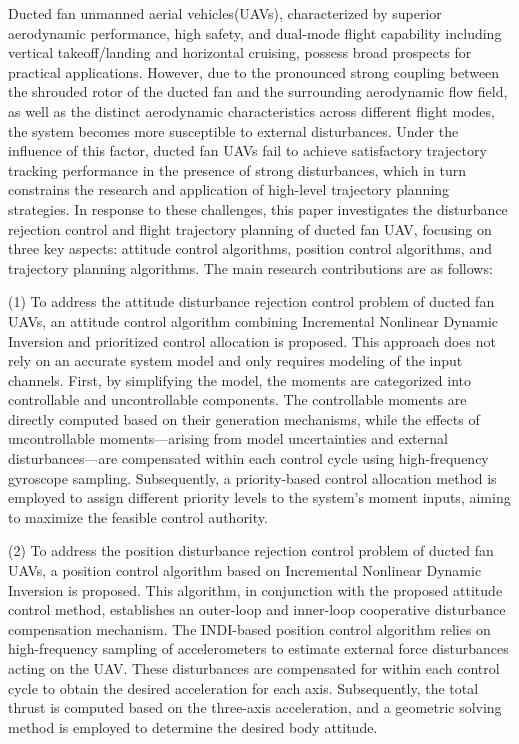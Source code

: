 Ducted fan unmanned aerial vehicles(UAVs), characterized by superior aerodynamic performance, high safety, and dual-mode flight capability including vertical takeoff/landing and horizontal cruising, possess broad prospects for practical applications. However, due to the pronounced strong coupling between the shrouded rotor of the ducted fan and the surrounding aerodynamic flow field, as well as the distinct aerodynamic characteristics across different flight modes, the system becomes more susceptible to external disturbances. Under the influence of this factor, ducted fan UAVs fail to achieve satisfactory trajectory tracking performance in the presence of strong disturbances, which in turn constrains the research and application of high-level trajectory planning strategies. In response to these challenges, this paper investigates the disturbance rejection control and flight trajectory planning of ducted fan UAV, focusing on three key aspects: attitude control algorithms, position control algorithms, and trajectory planning algorithms. The main research contributions are as follows:

(1) To address the attitude disturbance rejection control problem of ducted fan UAVs, an attitude control algorithm combining Incremental Nonlinear Dynamic Inversion and prioritized control allocation is proposed. This approach does not rely on an accurate system model and only requires modeling of the input channels. First, by simplifying the model, the moments are categorized into controllable and uncontrollable components. The controllable moments are directly computed based on their generation mechanisms, while the effects of uncontrollable moments—arising from model uncertainties and external disturbances—are compensated within each control cycle using high-frequency gyroscope sampling. Subsequently, a priority-based control allocation method is employed to assign different priority levels to the system's moment inputs, aiming to maximize the feasible control authority.

(2) To address the position disturbance rejection control problem of ducted fan UAVs, a position control algorithm based on Incremental Nonlinear Dynamic Inversion is proposed. This algorithm, in conjunction with the proposed attitude control method, establishes an outer-loop and inner-loop cooperative disturbance compensation mechanism. The INDI-based position control algorithm relies on high-frequency sampling of accelerometers to estimate external force disturbances acting on the UAV. These disturbances are compensated for within each control cycle to obtain the desired acceleration for each axis. Subsequently, the total thrust is computed based on the three-axis acceleration, and a geometric solving method is employed to determine the desired body attitude.

